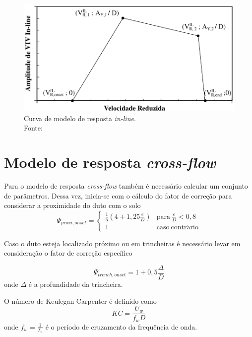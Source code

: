 \begin{figure}[th!]
    \centering
    \includegraphics[width=0.8\linewidth]{imagens/response_model_IL}
    \caption[Curva de modelo de resposta \textit{in-line}]{Curva de modelo de resposta \textit{in-line}.\\Fonte:~}
    \label{fig:viv-responsemodelil}
\end{figure}

\section{Modelo de resposta \textit{cross-flow}}

Para o modelo de resposta \textit{cross-flow} também  é necessário calcular um conjunto de parâmetros. Dessa vez, inicia-se com o cálculo do fator de correção para considerar a proximidade do duto com o solo
\begin{equation}
\label{eq:viv-Psi}
\Psi_{\mathit{proxi}, \mathit{onset}} =
\left\{
\begin{matrix}
\frac{1}{5}\left(4 + 1,25\frac{e}{D} \right) & \mathrm{para}~\frac{e}{D} < 0,8\\
1                                            & \mathrm{caso~contr\acute{a}rio}
\end{matrix}
\right.
\end{equation}

Caso o duto esteja localizado próximo ou em trincheiras é necessário levar em consideração o fator de correção específico

\begin{equation}
\label{eq:viv-Psitren}
\Psi_{\mathit{trench}, \mathit{onset}} = 1 + 0,5\frac{\Delta}{D}
\end{equation}
onde $\Delta$ é a profundidade da trincheira.

O número de Keulegan-Carpenter é definido como
\begin{equation}
\label{eq:viv-KC}
\mathit{KC} = \frac{U_w}{f_w D}
\end{equation}
onde $f_w = \frac{1}{T_u}$ é o período de cruzamento da frequência de onda.

